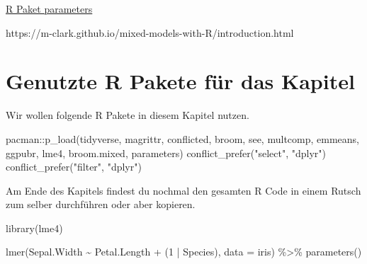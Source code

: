 \documentclass[
  letterpaper,
]{scrbook}
\newenvironment{Shaded}{\begin{snugshade}}{\end{snugshade}}
\newcommand{\AttributeTok}[1]{\textcolor[rgb]{0.40,0.45,0.13}{#1}}
\newcommand{\DecValTok}[1]{\textcolor[rgb]{0.68,0.00,0.00}{#1}}
\newcommand{\FunctionTok}[1]{\textcolor[rgb]{0.28,0.35,0.67}{#1}}
\newcommand{\NormalTok}[1]{\textcolor[rgb]{0.00,0.23,0.31}{#1}}
\newcommand{\SpecialCharTok}[1]{\textcolor[rgb]{0.37,0.37,0.37}{#1}}
\newcommand{\StringTok}[1]{\textcolor[rgb]{0.13,0.47,0.30}{#1}}
\begin{document}

\href{https://easystats.github.io/parameters/articles/model_parameters.html}{R
Paket parameters}

https://m-clark.github.io/mixed-models-with-R/introduction.html

\hypertarget{genutzte-r-pakete-fuxfcr-das-kapitel-21}{%
\section{Genutzte R Pakete für das
Kapitel}\label{genutzte-r-pakete-fuxfcr-das-kapitel-21}}

Wir wollen folgende R Pakete in diesem Kapitel nutzen.

\begin{Shaded}
\begin{Highlighting}[]
\NormalTok{pacman}\SpecialCharTok{::}\FunctionTok{p\_load}\NormalTok{(tidyverse, magrittr, conflicted, broom, see,}
\NormalTok{               multcomp, emmeans, ggpubr, lme4, broom.mixed,}
\NormalTok{               parameters)}
\FunctionTok{conflict\_prefer}\NormalTok{(}\StringTok{"select"}\NormalTok{, }\StringTok{"dplyr"}\NormalTok{)}
\FunctionTok{conflict\_prefer}\NormalTok{(}\StringTok{"filter"}\NormalTok{, }\StringTok{"dplyr"}\NormalTok{)}
\end{Highlighting}
\end{Shaded}

Am Ende des Kapitels findest du nochmal den gesamten R Code in einem
Rutsch zum selber durchführen oder aber kopieren.

\begin{Shaded}
\begin{Highlighting}[]
\FunctionTok{library}\NormalTok{(lme4)}

\FunctionTok{lmer}\NormalTok{(Sepal.Width }\SpecialCharTok{\textasciitilde{}}\NormalTok{ Petal.Length }\SpecialCharTok{+}\NormalTok{ (}\DecValTok{1} \SpecialCharTok{|}\NormalTok{ Species), }\AttributeTok{data =}\NormalTok{ iris) }\SpecialCharTok{\%\textgreater{}\%}
  \FunctionTok{parameters}\NormalTok{()}
\end{Highlighting}
\end{Shaded}
\end{document}

